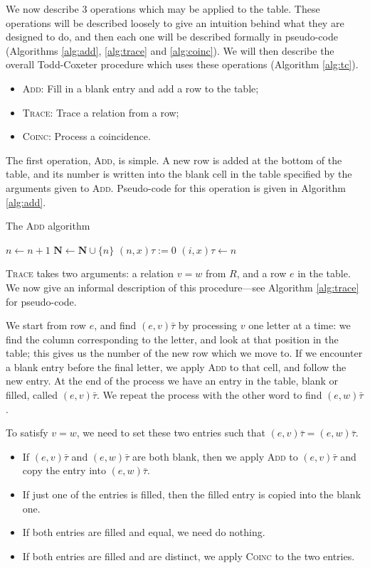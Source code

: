 We now describe 3 operations which may be applied to the table.  These
operations will be described loosely to give an intuition behind what they are
designed to do, and then each one will be described formally in pseudo-code
(Algorithms \ref{alg:add}, \ref{alg:trace} and \ref{alg:coinc}).  We will then
describe the overall Todd-Coxeter procedure which uses these operations
(Algorithm \ref{alg:tc}).

\begin{itemize}
\item \textsc{Add}: Fill in a blank entry and add a row to the table;
\item \textsc{Trace}: Trace a relation from a row;
\item \textsc{Coinc}: Process a coincidence.
\end{itemize}

The first operation, \textsc{Add}, is simple.  A new row is added at the bottom
of the table, and its number is written into the blank cell in the table
specified by the arguments given to \textsc{Add}.  Pseudo-code for this
operation is given in Algorithm \ref{alg:add}.

\begin{algorithm}
\caption{The \textsc{Add} algorithm}
\label{alg:add}
\begin{algorithmic}[1]
\State $n \gets n + 1$
\State $\mathbf{N} \gets \mathbf{N} \cup \{n\}$
  \State $(n, x)\tau := 0$
\EndFor
\State $(i, x)\tau \gets n$  
\EndProcedure
\end{algorithmic}
\end{algorithm}

\textsc{Trace} takes two arguments: a relation $v=w$ from $R$, and a row $e$
in the table.  We now give an informal description of this procedure---see
Algorithm \ref{alg:trace} for pseudo-code.

We start from row $e$, and find $(e, v)\bar\tau$ by processing $v$ one letter at a time: we
find the column corresponding to the letter, and look at that position in the
table; this gives us the number of the new row which we move to.  If we
encounter a blank entry before the final letter, we apply \textsc{Add} to that
cell, and follow the new entry.  At the end of the process we have an entry in
the table, blank or filled, called $(e, v)\bar\tau$.  We repeat the
process with the other word to find $(e, w)\bar\tau$.

To satisfy $v=w$, we need to set these two entries such that
$(e, v)\bar\tau = (e, w)\bar\tau$.
\begin{itemize}
\item If $(e, v)\bar\tau$ and $(e, w)\bar\tau$ are both blank, then we apply
  \textsc{Add} to $(e, v)\bar\tau$ and copy the entry into $(e, w)\bar\tau$.
\item If just one of the entries is filled, then the filled entry is copied into
  the blank one.
\item If both entries are filled and equal, we need do nothing.
\item If both entries are filled and are distinct, we apply \textsc{Coinc} to
  the two entries.
\end{itemize}

